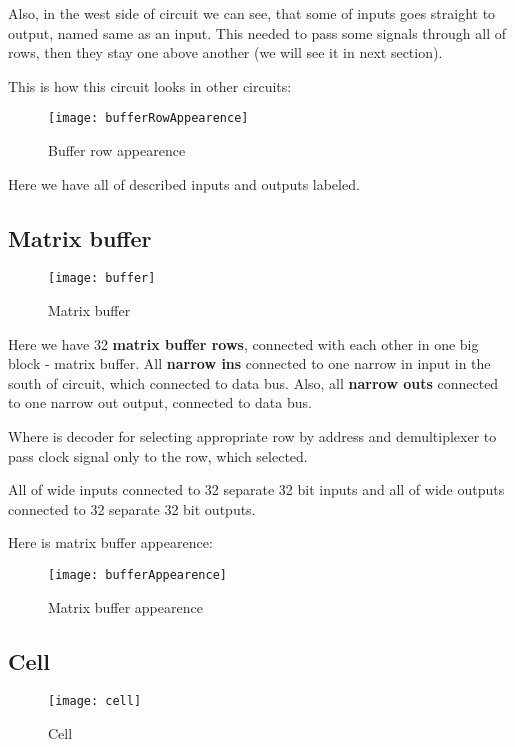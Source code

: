 Also, in the west side of circuit we can see, that some of inputs goes straight to output, named same as an input. This needed to pass some signals through all of rows, then they stay one above another (we will see it in next section).

This is how this circuit looks in other circuits:

\begin{figure}[ht]
	\centering
	\texttt{[image: bufferRowAppearence]}
	\caption{Buffer row appearence}
\end{figure}

\clearpage

Here we have all of described inputs and outputs labeled.

\subsection*{Matrix buffer}

\begin{figure}[ht]
	\centering
	\texttt{[image: buffer]}
	\caption{Matrix buffer}
\end{figure}

Here we have 32 \textbf{matrix buffer rows}, connected with each other in one big block - matrix buffer. All \textbf{narrow ins} connected to one narrow in input in the south of circuit, which connected to data bus. Also, all \textbf{narrow outs} connected to one narrow out output, connected to data bus.

Where is decoder for selecting appropriate row by address and demultiplexer to pass clock signal only to the row, which selected.

All of wide inputs connected to 32 separate 32 bit inputs and all of wide outputs connected to 32 separate 32 bit outputs.

\clearpage
Here is matrix buffer appearence:

\begin{figure}[ht]
	\centering
	\texttt{[image: bufferAppearence]}
	\caption{Matrix buffer appearence}
\end{figure}

\subsection*{Cell}

\begin{figure}[!htb]
	\centering
	\texttt{[image: cell]}
	\caption{Cell}
\end{figure}

